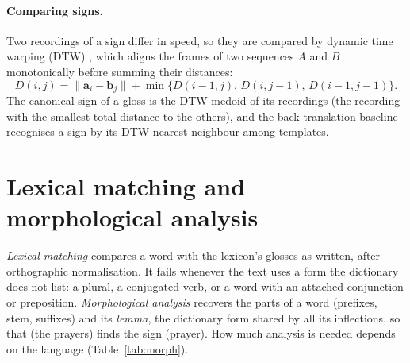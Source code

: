 \paragraph{Comparing signs.} Two recordings of a sign differ in speed, so they are compared by dynamic time warping
(DTW) \cite{dtw}, which aligns the frames of two sequences $A$ and $B$ monotonically before summing their distances:
\begin{equation}
D(i,j) = \lVert \mathbf{a}_i - \mathbf{b}_j \rVert + \min\{D(i-1,j),\, D(i,j-1),\, D(i-1,j-1)\}.
\end{equation}
The canonical sign of a gloss is the DTW medoid of its recordings (the recording with the smallest total distance to
the others), and the back-translation baseline recognises a sign by its DTW nearest neighbour among templates.

\section{Lexical matching and morphological analysis}
\emph{Lexical matching} compares a word with the lexicon's glosses as written, after orthographic normalisation.
It fails whenever the text uses a form the dictionary does not list: a plural, a conjugated verb, or a word with an
attached conjunction or preposition. \emph{Morphological analysis} recovers the parts of a word (prefixes, stem,
suffixes) and its \emph{lemma}, the dictionary form shared by all its inflections, so that  (the prayers)
finds the sign  (prayer). How much analysis is needed depends on the language (Table~\ref{tab:morph}).

